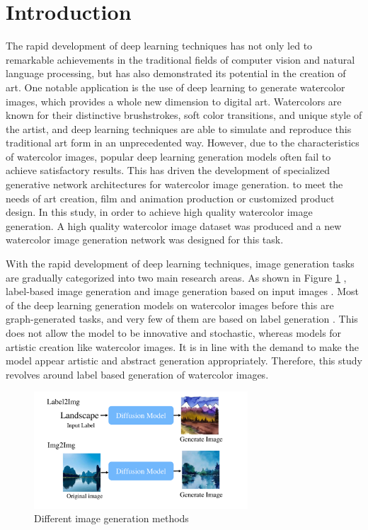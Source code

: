 \documentclass{acsman}
\begin{document}

\section{Introduction}
The rapid development of deep learning techniques has not only led to remarkable achievements in the traditional fields of computer vision and natural language processing, but has also demonstrated its potential in the creation of art. One notable application is the use of deep learning to generate watercolor images, which provides a whole new dimension to digital art. Watercolors are known for their distinctive brushstrokes, soft color transitions, and unique style of the artist, and deep learning techniques are able to simulate and reproduce this traditional art form in an unprecedented way. However, due to the characteristics of watercolor images, popular deep learning generation models often fail to achieve satisfactory results. This has driven the development of specialized generative network architectures for watercolor image generation. to meet the needs of art creation, film and animation production or customized product design. In this study, in order to achieve high quality watercolor image generation. A high quality watercolor image dataset was produced and a new watercolor image generation network was designed for this task.

With the rapid development of deep learning techniques, image generation tasks are gradually categorized into two main research areas. As shown in Figure \ref{fig:intro} , label-based image generation and image generation based on input images \cite{isola2017image}. Most of the deep learning generation models on watercolor images before this are graph-generated tasks, and very few of them are based on label generation \cite{wang2023stroke}. This does not allow the model to be innovative and stochastic, whereas models for artistic creation like watercolor images. It is in line with the demand to make the model appear artistic and abstract generation appropriately. Therefore, this study revolves around label based generation of watercolor images.

\begin{figure}[h]
    \centering
    \includegraphics[width=8cm]{image/intro.pdf}
    \caption{Different image generation methods}
    \label{fig:intro}
\end{figure}
\end{document}
